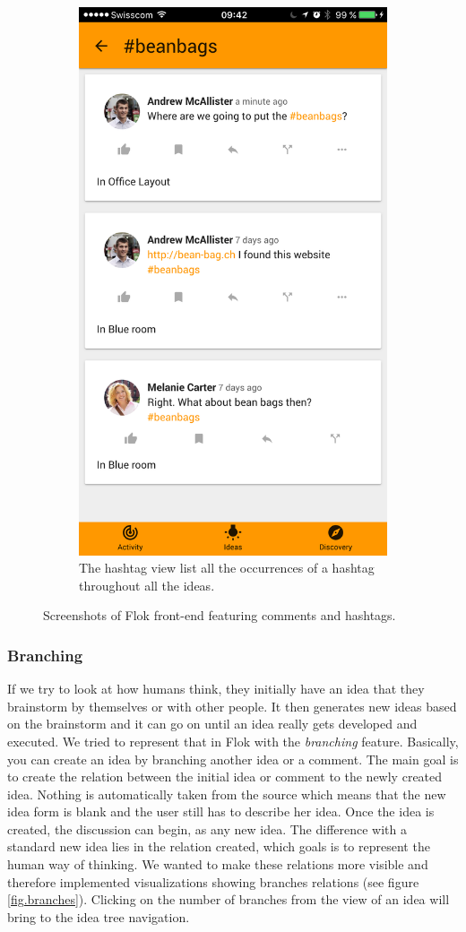 \documentclass[a4paper,12pt,twoside]{article}
\begin{document}
\begin{figure}[!htb]
\begin{subfigure}[t]{.48\textwidth}
        \includegraphics[width=.67\textwidth]{images/hashtagView.png}
        \caption{The hashtag view list all the occurrences of a hashtag throughout all the ideas.}
        \label{fig.hashtagView}
    \end{subfigure}
    \caption{Screenshots of Flok front-end featuring comments and hashtags.}
\end{figure}

\subsubsection{Branching}
\label{sec.branching}
If we try to look at how humans think, they initially have an idea that they brainstorm by themselves or with other people.
It then generates new ideas based on the brainstorm and it can go on until an idea really gets developed and executed.
We tried to represent that in Flok with the \emph{branching} feature.
Basically, you can create an idea by branching another idea or a comment.
The main goal is to create the relation between the initial idea or comment to the newly created idea.
Nothing is automatically taken from the source which means that the new idea form is blank and the user still has to describe her idea.
Once the idea is created, the discussion can begin, as any new idea.
The difference with a standard new idea lies in the relation created, which goals is to represent the human way of thinking.
We wanted to make these relations more visible and therefore implemented visualizations showing branches relations (see figure \ref{fig.branches}).
Clicking on the number of branches from the view of an idea will bring to the idea tree navigation.
\end{document}
